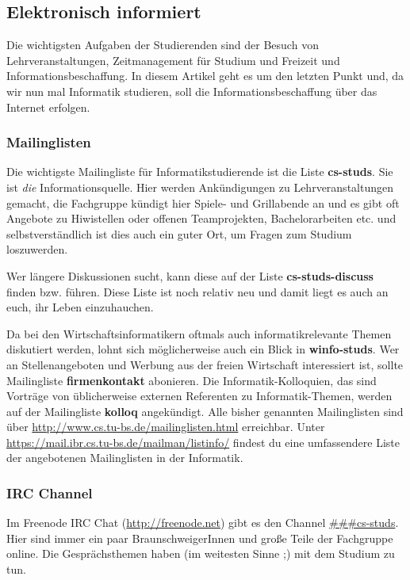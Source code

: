 \subsection{Elektronisch informiert}
	\label{elekinf}
	Die wichtigsten Aufgaben der Studierenden sind der Besuch von Lehrveranstaltungen, Zeitmanagement für Studium und Freizeit und Informationsbeschaffung. In diesem Artikel geht es um den letzten Punkt und, da wir nun mal Informatik studieren, soll die Informationsbeschaffung über das Internet erfolgen.

	\subsubsection*{Mailinglisten}
	\label{mailinglisten}
		Die wichtigste Mailingliste für Informatikstudierende ist die Liste \textbf{cs-studs}. Sie ist \emph{die} Informationsquelle. Hier werden Ankündigungen zu Lehrveranstaltungen gemacht, die Fachgruppe kündigt hier Spiele- und Grillabende an und es gibt oft Angebote zu Hiwistellen oder offenen Teamprojekten, Bachelorarbeiten etc. und selbstverständlich ist dies auch ein guter Ort, um Fragen zum Studium loszuwerden.

		Wer längere Diskussionen sucht, kann diese auf der Liste \textbf{cs-studs-discuss} finden bzw. führen. Diese Liste ist noch relativ neu und damit liegt es auch an euch, ihr Leben einzuhauchen.

		Da bei den Wirtschaftsinformatikern oftmals auch informatikrelevante Themen diskutiert werden, lohnt sich möglicherweise auch ein Blick in \textbf{winfo-studs}. 
		Wer an Stellenangeboten und Werbung aus der freien
		Wirtschaft interessiert ist, sollte Mailingliste
		\textbf{firmenkontakt} abonieren. Die
		Informatik-Kolloquien, das sind Vorträge von
		üblicherweise externen Referenten zu Informatik-Themen,
		werden auf der Mailingliste \textbf{kolloq} angekündigt.
		Alle bisher genannten Mailinglisten sind über
		\url{http://www.cs.tu-bs.de/mailinglisten.html}
		erreichbar. Unter
		\url{https://mail.ibr.cs.tu-bs.de/mailman/listinfo/}
		findest du eine umfassendere Liste der angebotenen Mailinglisten in der Informatik.

	\subsubsection*{IRC Channel}
		Im Freenode IRC Chat (\url{http://freenode.net}) gibt es den Channel \url{###cs-studs}. Hier sind immer ein paar BraunschweigerInnen und große Teile der Fachgruppe online. Die Gesprächsthemen haben (im weitesten Sinne ;) mit dem Studium zu tun.

